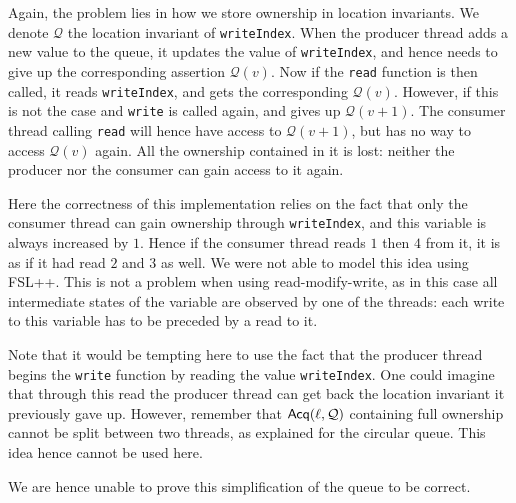 Again, the problem lies in how we store ownership in location invariants. We denote $\mathcal{Q}$ the location invariant of \texttt{writeIndex}. When the producer thread adds a new value to the queue, it updates the value of \texttt{writeIndex}, and hence needs to give up the corresponding assertion $\mathcal{Q}(v)$. Now if the \texttt{read} function is then called, it reads \texttt{writeIndex}, and gets the corresponding $\mathcal{Q}(v)$. However, if this is not the case and \texttt{write} is called again, and gives up $\mathcal{Q}(v + 1)$. The consumer thread calling \texttt{read} will hence have access to $\mathcal{Q}(v + 1)$, but has no way to access $\mathcal{Q}(v)$ again. All the ownership contained in it is lost: neither the producer nor the consumer can gain access to it again.

Here the correctness of this implementation relies on the fact that only the consumer thread can gain ownership through \texttt{writeIndex}, and this variable is always increased by $1$. Hence if the consumer thread reads $1$ then $4$ from it, it is as if it had read $2$ and $3$ as well. We were not able to model this idea using FSL++. This is not a problem when using read-modify-write, as in this case all intermediate states of the variable are observed by one of the threads: each write to this variable has to be preceded by a read to it.

Note that it would be tempting here to use the fact that the producer thread begins the \texttt{write} function by reading the value \texttt{writeIndex}. One could imagine that through this read the producer thread can get back the location invariant it previously gave up. However, remember that $\operatorname{\mathsf{Acq}}(\ell, \mathcal{Q})$ containing full ownership cannot be split between two threads, as explained for the circular queue. This idea hence cannot be used here.

We are hence unable to prove this simplification of the queue to be correct. 
